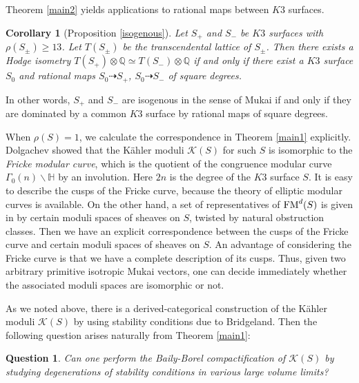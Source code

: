 \documentclass{article}
\theoremstyle{plain}
\newtheorem{corollary}[theorem]{Corollary}%
\newtheorem{question}[theorem]{Question}
\theoremstyle{definition}
\theoremstyle{remark}
\newcommand{\Q}{{\mathbb Q}}
\begin{document}
Theorem \ref{main2} yields applications to rational maps between $K3$ surfaces. 


\begin{corollary}[Proposition \ref{isogenous}]\label{main3} 
Let $S_{+}$ and $S_{-}$ be $K3$ surfaces 
with $\rho (S_{\pm}) \geq 13$. 
Let $T(S_{\pm})$ be the transcendental lattice of $S_{\pm}$. 
Then there exists a Hodge isometry $T(S_{+})\otimes {\Q} \simeq T(S_{-})\otimes {\Q}$ 
if and only if  
there exist a $K3$ surface $S_{0}$ and 
rational maps $S_{0} \dashrightarrow S_{+}$, $S_{0} \dashrightarrow S_{-}$  of square degrees. 
\end{corollary}


In other words,  
$S_{+}$ and $S_{-}$ are isogenous in the sense of Mukai \cite{Mu} 
if and only if they are dominated by a common $K3$ surface 
by rational maps of square degrees.  





When $\rho (S) = 1$, 
we calculate the correspondence in Theorem \ref{main1} explicitly.  
Dolgachev \cite{Do} showed that 
the K\"ahler moduli $\mathcal{K} (S)$ for such $S$  is isomorphic to 
the {\it Fricke modular curve\/},  
which is the quotient of the congruence modular curve $\Gamma _{0}(n) \backslash {\mathbb H}$ 
by an involution. 
Here $2n$ is the degree of the $K3$ surface $S$. 
It is easy to describe the cusps of the Fricke curve,  
because the theory of elliptic modular curves is available.    
On the other hand,  
a set of representatives of ${\rm FM\/}^{d}(S)$ 
is given in \cite{Ma2} by certain moduli spaces of sheaves on $S$, 
twisted by natural obstruction classes.  
Then 
we have an explicit correspondence between 
the cusps of the Fricke curve 
and certain moduli spaces of sheaves on $S$. 
An advantage of 
considering the Fricke curve is that 
we have a complete description of its cusps.    
Thus, given two arbitrary primitive isotropic Mukai vectors, 
one can decide immediately  
whether the associated moduli spaces   
are isomorphic or not. 





As we noted above,  
there is a derived-categorical construction of the K\"ahler moduli $\mathcal{K} (S)$ by using stability conditions due to Bridgeland. 
Then the following question arises naturally from Theorem \ref{main1}:   


\begin{question}
Can one perform the Baily-Borel compactification of $\mathcal{K} (S)$ 
by studying degenerations of stability conditions in various large volume limits?  
\end{question}  
\end{document}
